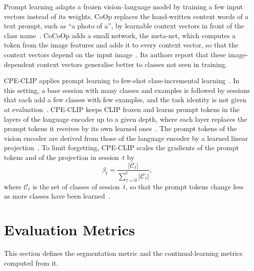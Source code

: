Prompt learning adapts a frozen vision--language model by training a few input vectors instead of its weights.
CoOp replaces the hand-written context words of a text prompt, such as ``a photo of a'', by learnable context vectors in front of the class name~\cite{zhou2022coop}.
CoCoOp adds a small network, the meta-net, which computes a token from the image features and adds it to every context vector, so that the context vectors depend on the input image~\cite[Secs.~3.3 and~4.1]{zhou2022cocoop}.
Its authors report that these image-dependent context vectors generalise better to classes not seen in training.

CPE-CLIP applies prompt learning to few-shot class-incremental learning~\cite[Secs.~1 and~3]{D_Alessandro_2023}.
In this setting, a base session with many classes and examples is followed by sessions that each add a few classes with few examples, and the task identity is not given at evaluation~\cite[Secs.~2.3 and~3]{D_Alessandro_2023}.
CPE-CLIP keeps CLIP frozen and learns prompt tokens in the layers of the language encoder up to a given depth, where each layer replaces the prompt tokens it receives by its own learned ones~\cite[Sec.~4, Eqs.~2--4]{D_Alessandro_2023}.
The prompt tokens of the vision encoder are derived from those of the language encoder by a learned linear projection~\cite[Sec.~4, Eqs.~6--8]{D_Alessandro_2023}.
To limit forgetting, CPE-CLIP scales the gradients of the prompt tokens and of the projection in session~$t$ by
\begin{equation}
\beta_t = \frac{|\mathcal{C}_t|}{\sum_{\tau=0}^{t} |\mathcal{C}_\tau|},
\label{eq:bg-cpe-scaling}
\end{equation}
where $\mathcal{C}_t$ is the set of classes of session~$t$, so that the prompt tokens change less as more classes have been learned~\cite[Sec.~4, Eqs.~11--13]{D_Alessandro_2023}.

\section{Evaluation Metrics}
\label{sec:bg-metrics}

This section defines the segmentation metric and the continual-learning metrics computed from it.

